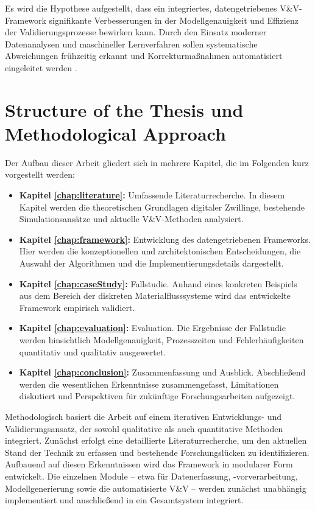 Es wird die Hypothese aufgestellt, dass ein integriertes, datengetriebenes V\&V-Framework signifikante Verbesserungen in der Modellgenauigkeit und Effizienz der Validierungsprozesse bewirken kann. Durch den Einsatz moderner Datenanalysen und maschineller Lernverfahren sollen systematische Abweichungen frühzeitig erkannt und Korrekturmaßnahmen automatisiert eingeleitet werden \parencite{Tao2018}.

\section{Structure of the Thesis und Methodological Approach}

Der Aufbau dieser Arbeit gliedert sich in mehrere Kapitel, die im Folgenden kurz vorgestellt werden:

\begin{itemize}
  \item \textbf{Kapitel \ref{chap:literature}:} Umfassende Literaturrecherche. In diesem Kapitel werden die theoretischen Grundlagen digitaler Zwillinge, bestehende Simulationsansätze und aktuelle V\&V-Methoden analysiert.
  \item \textbf{Kapitel \ref{chap:framework}:} Entwicklung des datengetriebenen Frameworks. Hier werden die konzeptionellen und architektonischen Entscheidungen, die Auswahl der Algorithmen und die Implementierungsdetails dargestellt.
  \item \textbf{Kapitel \ref{chap:caseStudy}:} Fallstudie. Anhand eines konkreten Beispiels aus dem Bereich der diskreten Materialflusssysteme wird das entwickelte Framework empirisch validiert.
  \item \textbf{Kapitel \ref{chap:evaluation}:} Evaluation. Die Ergebnisse der Fallstudie werden hinsichtlich Modellgenauigkeit, Prozesszeiten und Fehlerhäufigkeiten quantitativ und qualitativ ausgewertet.
  \item \textbf{Kapitel \ref{chap:conclusion}:} Zusammenfassung und Ausblick. Abschließend werden die wesentlichen Erkenntnisse zusammengefasst, Limitationen diskutiert und Perspektiven für zukünftige Forschungsarbeiten aufgezeigt.
\end{itemize}

Methodologisch basiert die Arbeit auf einem iterativen Entwicklungs- und Validierungsansatz, der sowohl qualitative als auch quantitative Methoden integriert. Zunächst erfolgt eine detaillierte Literaturrecherche, um den aktuellen Stand der Technik zu erfassen und bestehende Forschungslücken zu identifizieren. Aufbauend auf diesen Erkenntnissen wird das Framework in modularer Form entwickelt. Die einzelnen Module – etwa für Datenerfassung, -vorverarbeitung, Modellgenerierung sowie die automatisierte V\&V – werden zunächst unabhängig implementiert und anschließend in ein Gesamtsystem integriert.

